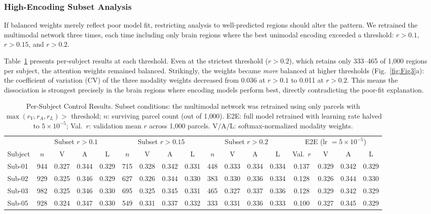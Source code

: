\documentclass[conference]{IEEEtran}
\begin{document}
\subsubsection{High-Encoding Subset Analysis}
If balanced weights merely reflect poor model fit, restricting analysis to well-predicted regions should alter the pattern. We retrained the multimodal network three times, each time including only brain regions where the best unimodal encoding exceeded a threshold: $r > 0.1$, $r > 0.15$, and $r > 0.2$.

Table~\ref{tab:subset_detail} presents per-subject results at each threshold. Even at the strictest threshold ($r > 0.2$), which retains only 333--465 of 1,000 regions per subject, the attention weights remained balanced. Strikingly, the weights became \textit{more} balanced at higher thresholds (Fig.~\ref{fig:Fig3}a): the coefficient of variation (CV) of the three modality weights decreased from 0.036 at $r > 0.1$ to 0.011 at $r > 0.2$. This means the dissociation is strongest precisely in the brain regions where encoding models perform best, directly contradicting the poor-fit explanation.

\begin{table}[t]
\caption{Per-Subject Control Results. Subset conditions: the multimodal network was retrained using only parcels with $\max(r_V, r_A, r_L) >$ threshold; $n$: surviving parcel count (out of 1{,}000). E2E: full model retrained with learning rate halved to $5 \times 10^{-5}$; Val.\ $r$: validation mean $r$ across 1{,}000 parcels. V/A/L: softmax-normalized modality weights.}
\label{tab:subset_detail}
\centering
\footnotesize
\setlength{\tabcolsep}{3.2pt}
\begin{tabular*}{\textwidth}{@{\extracolsep{\fill}}l cccc cccc cccc cccc@{}}
\toprule
 & \multicolumn{4}{c}{Subset $r\!>\!0.1$} & \multicolumn{4}{c}{Subset $r\!>\!0.15$} & \multicolumn{4}{c}{Subset $r\!>\!0.2$} & \multicolumn{4}{c}{E2E (lr $=5\!\times\!10^{-5}$)} \\
\cmidrule(lr){2-5}\cmidrule(lr){6-9}\cmidrule(lr){10-13}\cmidrule(lr){14-17}
Subject & $n$ & V & A & L & $n$ & V & A & L & $n$ & V & A & L & Val.\ $r$ & V & A & L \\
\midrule
Sub-01 & 944 & 0.327 & 0.344 & 0.329 & 715 & 0.328 & 0.342 & 0.331 & 448 & 0.333 & 0.334 & 0.334 & 0.137 & 0.329 & 0.342 & 0.329 \\
Sub-02 & 929 & 0.325 & 0.346 & 0.329 & 627 & 0.326 & 0.344 & 0.330 & 383 & 0.330 & 0.336 & 0.334 & 0.128 & 0.326 & 0.344 & 0.330 \\
Sub-03 & 982 & 0.325 & 0.346 & 0.330 & 695 & 0.325 & 0.345 & 0.331 & 465 & 0.327 & 0.337 & 0.336 & 0.128 & 0.329 & 0.342 & 0.329 \\
Sub-05 & 928 & 0.324 & 0.347 & 0.330 & 549 & 0.331 & 0.337 & 0.332 & 333 & 0.331 & 0.336 & 0.333 & 0.100 & 0.327 & 0.345 & 0.329 \\
\bottomrule
\end{tabular*}
\end{table}
\end{document}
